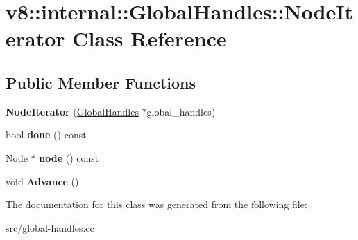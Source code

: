 \hypertarget{classv8_1_1internal_1_1_global_handles_1_1_node_iterator}{}\section{v8\+:\+:internal\+:\+:Global\+Handles\+:\+:Node\+Iterator Class Reference}
\label{classv8_1_1internal_1_1_global_handles_1_1_node_iterator}
\subsection*{Public Member Functions}
\begin{DoxyCompactItemize}
\item 
\hypertarget{classv8_1_1internal_1_1_global_handles_1_1_node_iterator_aecbfa8d72760a3e1cd195b42dac1f26d}{}{\bfseries Node\+Iterator} (\hyperlink{classv8_1_1internal_1_1_global_handles}{Global\+Handles} $\ast$global\+\_\+handles)\label{classv8_1_1internal_1_1_global_handles_1_1_node_iterator_aecbfa8d72760a3e1cd195b42dac1f26d}

\item 
\hypertarget{classv8_1_1internal_1_1_global_handles_1_1_node_iterator_a40dc34978779f6791f0005cd70553fb5}{}bool {\bfseries done} () const \label{classv8_1_1internal_1_1_global_handles_1_1_node_iterator_a40dc34978779f6791f0005cd70553fb5}

\item 
\hypertarget{classv8_1_1internal_1_1_global_handles_1_1_node_iterator_aea2b9f927de249868e0ae8f9061f51df}{}\hyperlink{classv8_1_1internal_1_1_global_handles_1_1_node}{Node} $\ast$ {\bfseries node} () const \label{classv8_1_1internal_1_1_global_handles_1_1_node_iterator_aea2b9f927de249868e0ae8f9061f51df}

\item 
\hypertarget{classv8_1_1internal_1_1_global_handles_1_1_node_iterator_a9b743acba4104988ae3f9a4db985133d}{}void {\bfseries Advance} ()\label{classv8_1_1internal_1_1_global_handles_1_1_node_iterator_a9b743acba4104988ae3f9a4db985133d}

\end{DoxyCompactItemize}


The documentation for this class was generated from the following file\+:\begin{DoxyCompactItemize}
\item 
src/global-\/handles.\+cc\end{DoxyCompactItemize}
